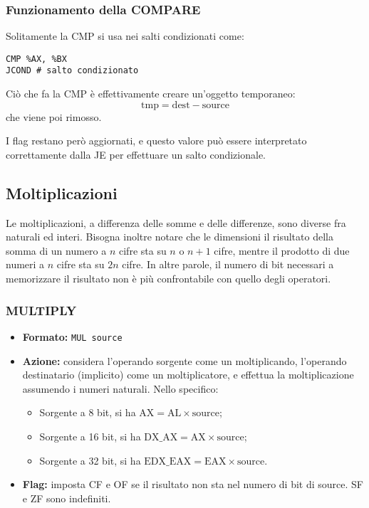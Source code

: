 \documentclass[a4paper,11pt]{article}
\begin{document}
\subsubsection{Funzionamento della COMPARE}
Solitamente la CMP si usa nei salti condizionati come:
\begin{lstlisting}[language=assembler,style=codestyle]	
CMP %AX, %BX
JCOND # salto condizionato
\end{lstlisting}
\noindent
Ciò che fa la CMP è effettivamente creare un'oggetto temporaneo:
$$
\text{tmp} = \text{dest} - \text{source}
$$
che viene poi rimosso.

I flag restano però aggiornati, e questo valore può essere interpretato correttamente dalla JE per effettuare un salto condizionale.


\subsection{Moltiplicazioni}
Le moltiplicazioni, a differenza delle somme e delle differenze, sono diverse fra naturali ed interi.
Bisogna inoltre notare che le dimensioni il risultato della somma di un numero a $n$ cifre sta su $n$ o $n+1$ cifre, mentre il prodotto di due numeri a $n$ cifre sta su $2n$ cifre.
In altre parole, il numero di bit necessari a memorizzare il risultato non è più confrontabile con quello degli operatori.


\subsubsection{MULTIPLY}
\begin{itemize}
	\item \textbf{Formato:} \lstinline|MUL source|
	\item \textbf{Azione:} considera l'operando sorgente come un moltiplicando, l'operando destinatario (implicito) come un moltiplicatore, e effettua la moltiplicazione assumendo i numeri naturali. Nello specifico:
	\begin{itemize}
		\item Sorgente a 8 bit, si ha $\text{AX} = \text{AL} \times \text{source}$;
		\item Sorgente a 16 bit, si ha $\text{DX}\_\text{AX} = \text{AX} \times \text{source}$;
		\item Sorgente a 32 bit, si ha $\text{EDX}\_\text{EAX} = \text{EAX} \times \text{source}$.
	\end{itemize}
	\item \textbf{Flag:} imposta CF e OF se il risultato non sta nel numero di bit di source. SF e ZF sono indefiniti.
\end{itemize}
\end{document}
